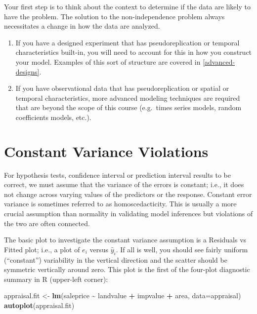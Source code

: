 \documentclass[
]{book}
\newenvironment{Shaded}{\begin{snugshade}}{\end{snugshade}}
\newcommand{\AttributeTok}[1]{\textcolor[rgb]{0.13,0.29,0.53}{#1}}
\newcommand{\FunctionTok}[1]{\textcolor[rgb]{0.13,0.29,0.53}{\textbf{#1}}}
\newcommand{\NormalTok}[1]{#1}
\newcommand{\OtherTok}[1]{\textcolor[rgb]{0.56,0.35,0.01}{#1}}
\newcommand{\SpecialCharTok}[1]{\textcolor[rgb]{0.81,0.36,0.00}{\textbf{#1}}}
\begin{document}
Your first step is to think about the context to determine if the data are likely to have the problem. The solution to the non-independence problem always necessitates a change in how the data are analyzed.

\begin{enumerate}
\def\labelenumi{\arabic{enumi}.}
\item
  If you have a designed experiment that has pseudoreplication or temporal characteristics built-in, you will need to account for this in how you construct your model. Examples of this sort of structure are covered in \ref{advanced-designs}.
\item
  If you have observational data that has pseudoreplication or spatial or temporal characteristics, more advanced modeling techniques are required that are beyond the scope of this course (e.g.~times series models, random coefficients models, etc.).
\end{enumerate}

\hypertarget{constant-variance-violations}{%
\section{Constant Variance Violations}\label{constant-variance-violations}}

For hypothesis tests, confidence interval or prediction interval results to be correct, we must assume that the variance of the errors is constant; i.e., it does not change across varying values of the predictors or the response. Constant error variance is sometimes referred to as homoscedacticity. This is usually a more crucial assumption than normality in validating model inferences but violations of the two are often connected.

The basic plot to investigate the constant variance assumption is a Residuals vs Fitted plot; i.e., a plot of \(e_i\) versus \(\hat{y}_i\). If all is well, you should see fairly uniform (``constant'') variability in the vertical direction and the scatter should be symmetric vertically around zero. This plot is the first of the four-plot diagnostic summary in R (upper-left corner):

\begin{Shaded}
\begin{Highlighting}[]
\NormalTok{appraisal.fit }\OtherTok{\textless{}{-}} \FunctionTok{lm}\NormalTok{(saleprice }\SpecialCharTok{\textasciitilde{}}\NormalTok{ landvalue }\SpecialCharTok{+}\NormalTok{ impvalue }\SpecialCharTok{+}\NormalTok{ area, }\AttributeTok{data=}\NormalTok{appraisal)}
\FunctionTok{autoplot}\NormalTok{(appraisal.fit)}
\end{Highlighting}
\end{Shaded}
\end{document}

